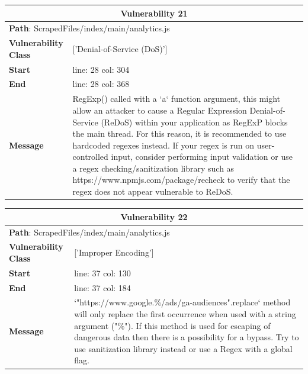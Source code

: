 \documentclass[12pt]{article}
\begin{document}
\vspace{0.7cm}
\FloatBarrier
\begin{table}[!h]
\centering
\renewcommand{\arraystretch}{1.3}
\begin{tabular}{|l|p{10cm}|}
\hline
\multicolumn{2}{|c|}{\textbf{Vulnerability 21}} \\
\hline
\multicolumn{2}{|l|}{\textbf{Path}: ScrapedFiles/index/main/analytics.js} \\
\hline
\textbf{Vulnerability Class} & ['Denial-of-Service (DoS)'] \\
\hline
\textbf{Start} & line: 28 \quad col: 304 \\
\hline
\textbf{End} & line: 28 \quad col: 368 \\
\hline
\textbf{Message} & RegExp() called with a `a` function argument, this might allow an attacker to cause a Regular Expression Denial-of-Service (ReDoS) within your application as RegExP blocks the main thread. For this reason, it is recommended to use hardcoded regexes instead. If your regex is run on user-controlled input, consider performing input validation or use a regex checking/sanitization library such as https://www.npmjs.com/package/recheck to verify that the regex does not appear vulnerable to ReDoS. \\
\hline
\end{tabular}
\end{table}
\vspace{0.7cm}
\FloatBarrier
\begin{table}[!h]
\centering
\renewcommand{\arraystretch}{1.3}
\begin{tabular}{|l|p{10cm}|}
\hline
\multicolumn{2}{|c|}{\textbf{Vulnerability 22}} \\
\hline
\multicolumn{2}{|l|}{\textbf{Path}: ScrapedFiles/index/main/analytics.js} \\
\hline
\textbf{Vulnerability Class} & ['Improper Encoding'] \\
\hline
\textbf{Start} & line: 37 \quad col: 130 \\
\hline
\textbf{End} & line: 37 \quad col: 184 \\
\hline
\textbf{Message} & `"https://www.google.\%/ads/ga-audiences".replace` method will only replace the first occurrence when used with a string argument ("\%"). If this method is used for escaping of dangerous data then there is a possibility for a bypass. Try to use sanitization library instead or use a Regex with a global flag. \\
\hline
\end{tabular}
\end{table}
\end{document}
